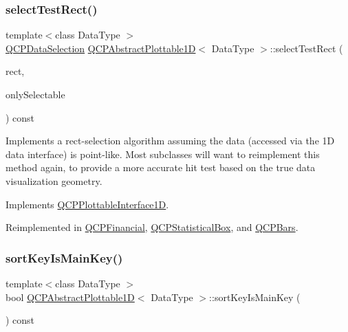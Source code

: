 \mbox{\label{class_q_c_p_abstract_plottable1_d_a22377bf6e57ab7eedbc9e489250c6ded}} 
\subsubsection{\texorpdfstring{select\+Test\+Rect()}{selectTestRect()}}
{\footnotesize\ttfamily template$<$class Data\+Type $>$ \\
\hyperlink{class_q_c_p_data_selection}{Q\+C\+P\+Data\+Selection} \hyperlink{class_q_c_p_abstract_plottable1_d}{Q\+C\+P\+Abstract\+Plottable1D}$<$ Data\+Type $>$\+::select\+Test\+Rect (\begin{DoxyParamCaption}\item[{const Q\+RectF \&}]{rect,  }\item[{bool}]{only\+Selectable }\end{DoxyParamCaption}) const\hspace{0.3cm}{\ttfamily [virtual]}}

Implements a rect-\/selection algorithm assuming the data (accessed via the 1D data interface) is point-\/like. Most subclasses will want to reimplement this method again, to provide a more accurate hit test based on the true data visualization geometry.

Implements \hyperlink{class_q_c_p_plottable_interface1_d_a67093e4ccf490ff5f7750640941ff34c}{Q\+C\+P\+Plottable\+Interface1D}.



Reimplemented in \hyperlink{class_q_c_p_financial_a3c5beb1ab028a1dba845fc9dcffc7cf4}{Q\+C\+P\+Financial}, \hyperlink{class_q_c_p_statistical_box_a42febad6ad5e924a151434cc434b4ffc}{Q\+C\+P\+Statistical\+Box}, and \hyperlink{class_q_c_p_bars_ab03bb6125c3e983b89d694f75ce6b3d5}{Q\+C\+P\+Bars}.

\mbox{\label{class_q_c_p_abstract_plottable1_d_afe0d56e39cc076032922f059b304c092}} 
\subsubsection{\texorpdfstring{sort\+Key\+Is\+Main\+Key()}{sortKeyIsMainKey()}}
{\footnotesize\ttfamily template$<$class Data\+Type $>$ \\
bool \hyperlink{class_q_c_p_abstract_plottable1_d}{Q\+C\+P\+Abstract\+Plottable1D}$<$ Data\+Type $>$\+::sort\+Key\+Is\+Main\+Key (\begin{DoxyParamCaption}{ }\end{DoxyParamCaption}) const\hspace{0.3cm}{\ttfamily [virtual]}}





